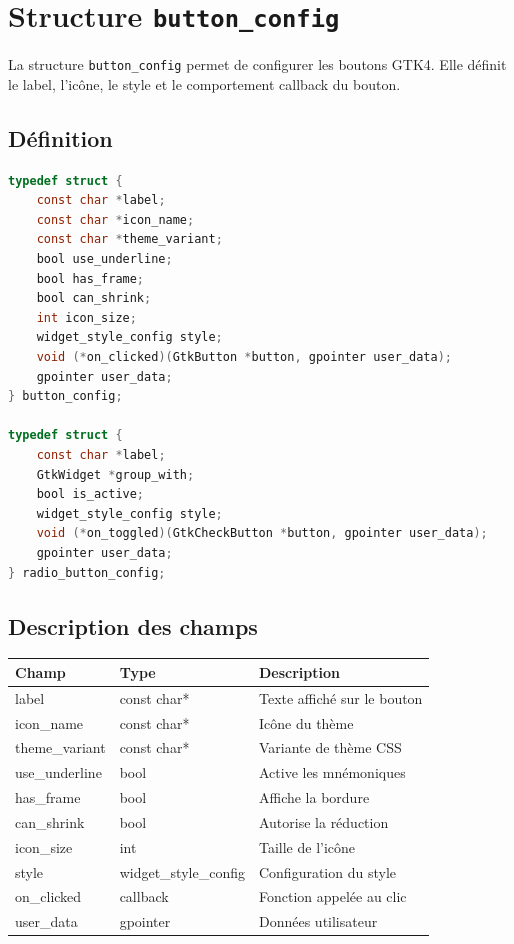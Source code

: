 \section{Structure \texttt{button\_config}}

La structure \texttt{button\_config} permet de configurer les boutons GTK4. Elle définit le label, l'icône, le style et le comportement callback du bouton.

\subsection{Définition}

\begin{lstlisting}[language=C]
typedef struct {
    const char *label;
    const char *icon_name;
    const char *theme_variant;
    bool use_underline;
    bool has_frame;
    bool can_shrink;
    int icon_size;
    widget_style_config style;
    void (*on_clicked)(GtkButton *button, gpointer user_data);
    gpointer user_data;
} button_config;

typedef struct {
    const char *label;
    GtkWidget *group_with;
    bool is_active;
    widget_style_config style;
    void (*on_toggled)(GtkCheckButton *button, gpointer user_data);
    gpointer user_data;
} radio_button_config;
\end{lstlisting}

\subsection{Description des champs}

\begin{center}
\begin{tabular}{|l|l|>{\raggedright\arraybackslash}p{6cm}|}
\hline
\textbf{Champ} & \textbf{Type} & \textbf{Description} \\
\hline
label & const char* & Texte affiché sur le bouton \\
\hline
icon\_name & const char* & Icône du thème \\
\hline
theme\_variant & const char* & Variante de thème CSS \\
\hline
use\_underline & bool & Active les mnémoniques \\
\hline
has\_frame & bool & Affiche la bordure \\
\hline
can\_shrink & bool & Autorise la réduction \\
\hline
icon\_size & int & Taille de l'icône \\
\hline
style & widget\_style\_config & Configuration du style \\
\hline
on\_clicked & callback & Fonction appelée au clic \\
\hline
user\_data & gpointer & Données utilisateur \\
\hline
\end{tabular}
\end{center}

